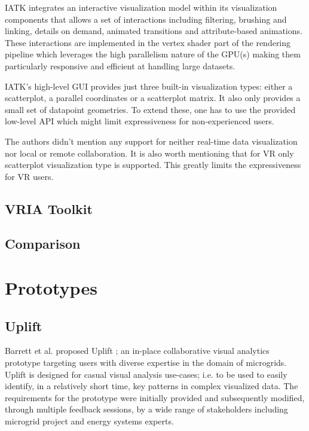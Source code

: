 \documentclass{vgtc}                          %
\begin{document}
IATK integrates an interactive visualization model within its visualization
components that allows a set of interactions including filtering, brushing and
linking, details on demand, animated transitions and attribute-based animations.
These interactions are implemented in the vertex shader part of the rendering
pipeline which leverages the high parallelism nature of the GPU(s) making them
particularly responsive and efficient at handling large datasets.

IATK's high-level GUI provides just three built-in visualization types:
either a scatterplot, a parallel coordinates or a scatterplot matrix. It also
only provides a small set of datapoint geometries. To extend these, one has to
use the provided low-level API which might limit expressiveness for
non-experienced users.

The authors didn't mention any support for neither real-time data
visualization nor local or remote collaboration. It is also worth mentioning
that for VR only scatterplot visualization type is supported. This greatly
limits the expressiveness for VR users.

\subsection{VRIA Toolkit}

\subsection{Comparison}

\section{Prototypes}
\subsection{Uplift}
Barrett et al. proposed Uplift \cite{uplift_prototype}; an in-place
collaborative visual analytics prototype targeting users with diverse
expertise in the domain of microgrids. Uplift is designed for casual visual
analysis use-cases; i.e. to be used to easily identify, in a relatively short
time, key patterns in complex visualized data. The requirements for the
prototype were initially provided and subsequently modified, through multiple
feedback sessions, by a wide range of stakeholders including microgrid project
and energy systems experts.

\smallskip
\end{document}
